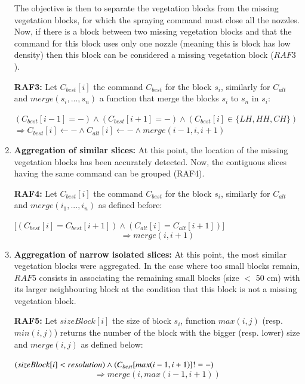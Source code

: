 \documentclass[preprint,3p,times,twocolumn]{elsarticle}
\begin{document}
\begin{enumerate}
The objective is then to separate the vegetation blocks from the missing vegetation blocks, for which the spraying command must close all the nozzles. Now, if there is a block between two missing vegetation blocks and that the command for this block uses only one nozzle (meaning this is block has low density) then this block can be considered a missing vegetation block ($RAF3$).

\textbf{RAF3:} Let $C_{best} [i]$ the command $C_{best}$ for the block $s_i$, similarly for $C_{alt}$ and $merge(s_{i},...,s_{n})$ a function that merge the blocks $s_i$ to $s_n$ in $s_i$: \\
\begin{mdframed}
	$  (C_{best} [i-1] = -) \wedge (C_{best} [i + 1] = -) \wedge  (C_{best} [i] \in \{LH, HH, CH \})$ \\
	$  \Rightarrow C_{best} [i] \leftarrow - \wedge C_{alt} [i] \leftarrow - \wedge merge(i-1,i,i+1)$
\end{mdframed}
\item \textbf{Aggregation of similar slices:} At this point, the location of the missing vegetation blocks has been accurately detected. Now, the contiguous slices having the same command can be grouped (RAF4). 

\textbf{RAF4:} Let $C_{best} [i]$ the command $C_{best}$ for the block $s_i$, similarly for $C_{alt}$ and $merge(i_{1},...,i_{n})$ as defined before:
\begin{mdframed}
	$\big[ (C_{best} [i] = C_{best} [i+1]) \wedge (C_{alt} [i] = C_{alt} [i+1] ) \big]$ 
	\[\Rightarrow merge(i,i+1)
	\]
\end{mdframed}

\item \textbf{Aggregation of narrow isolated slices:}
At this point, the most similar vegetation blocks were aggregated. In the case where too small blocks remain, $RAF5$ consists in associating the remaining small blocks (size $<$ 50 cm) with its larger neighbouring block at the condition that this block is not a missing vegetation block. 

\textbf{RAF5:}
Let $sizeBlock[i]$ the size of block $s_i$, function $max(i,j)$ (resp. $min(i,j)$) returns the number of the block with the bigger (resp. lower) size and $merge(i,j)$ as defined below:
\begin{mdframed}
	$ (sizeBlock[i] < resolution)  \wedge \\(C_{best} [max(i-1,i+1)] != -) $
	\[ \Rightarrow merge(i,max(i-1,i+1)) \]
	

\end{mdframed}
\end{enumerate}
\end{document}
